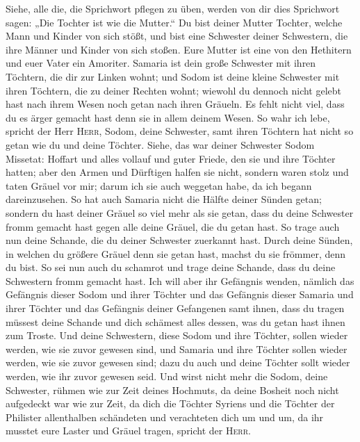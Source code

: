  Siehe, alle die, die Sprichwort pflegen zu üben, werden
von dir dies Sprichwort sagen: „Die Tochter ist wie die Mutter.``
 Du bist deiner Mutter Tochter, welche Mann und Kinder
von sich stößt, und bist eine Schwester deiner Schwestern, die ihre
Männer und Kinder von sich stoßen. Eure Mutter ist eine von den
Hethitern und euer Vater ein Amoriter.  Samaria ist dein
große Schwester mit ihren Töchtern, die dir zur Linken wohnt; und Sodom
ist deine kleine Schwester mit ihren Töchtern, die zu deiner Rechten
wohnt;  wiewohl du dennoch nicht gelebt hast nach ihrem
Wesen noch getan nach ihren Gräueln. Es fehlt nicht viel, dass du es
ärger gemacht hast denn sie in allem deinem Wesen.  So
wahr ich lebe, spricht der Herr \textsc{Herr}, Sodom, deine Schwester,
samt ihren Töchtern hat nicht so getan wie du und deine Töchter.
 Siehe, das war deiner Schwester Sodom Missetat: Hoffart
und alles vollauf und guter Friede, den sie und ihre Töchter hatten;
aber den Armen und Dürftigen halfen sie nicht,  sondern
waren stolz und taten Gräuel vor mir; darum ich sie auch weggetan habe,
da ich begann dareinzusehen.  So hat auch Samaria nicht
die Hälfte deiner Sünden getan; sondern du hast deiner Gräuel so viel
mehr als sie getan, dass du deine Schwester fromm gemacht hast gegen
alle deine Gräuel, die du getan hast.  So trage auch nun
deine Schande, die du deiner Schwester zuerkannt hast. Durch deine
Sünden, in welchen du größere Gräuel denn sie getan hast, machst du sie
frömmer, denn du bist. So sei nun auch du schamrot und trage deine
Schande, dass du deine Schwestern fromm gemacht hast. 
Ich will aber ihr Gefängnis wenden, nämlich das Gefängnis dieser Sodom
und ihrer Töchter und das Gefängnis dieser Samaria und ihrer Töchter und
das Gefängnis deiner Gefangenen samt ihnen,  dass du
tragen müssest deine Schande und dich schämest alles dessen, was du
getan hast ihnen zum Troste.  Und deine Schwestern, diese
Sodom und ihre Töchter, sollen wieder werden, wie sie zuvor gewesen
sind, und Samaria und ihre Töchter sollen wieder werden, wie sie zuvor
gewesen sind; dazu du auch und deine Töchter sollt wieder werden, wie
ihr zuvor gewesen seid.  Und wirst nicht mehr die Sodom,
deine Schwester, rühmen wie zur Zeit deines Hochmuts,  da
deine Bosheit noch nicht aufgedeckt war wie zur Zeit, da dich die
Töchter Syriens und die Töchter der Philister allenthalben schändeten
und verachteten dich um und um,  da ihr musstet eure
Laster und Gräuel tragen, spricht der \textsc{Herr}.

